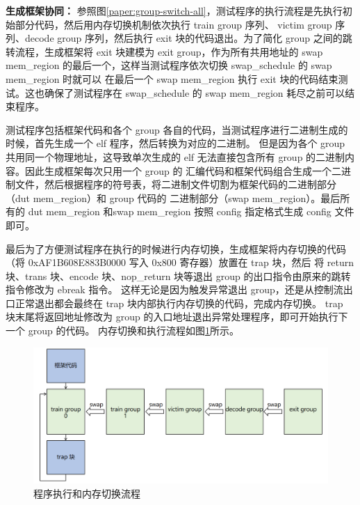 \textbf{生成框架协同：}
参照图\ref{paper:group-switch-all}，测试程序的执行流程是先执行初始部分代码，然后用内存切换机制依次执行 train group 序列、
victim group 序列、decode group 序列，然后执行 exit 块的代码退出。为了简化 group 之间的跳转流程，生成框架将 exit 块建模为
 exit group，作为所有共用地址的 swap mem\_region 的最后一个，这样当测试程序依次切换 swap\_schedule 的 swap mem\_region 时就可以
在最后一个 swap mem\_region 执行 exit 块的代码结束测试。这也确保了测试程序在 swap\_schedule 的 swap mem\_region 耗尽之前可以结束程序。\par

测试程序包括框架代码和各个 group 各自的代码，当测试程序进行二进制生成的时候，首先生成一个 elf 程序，然后转换为对应的二进制。
但是因为各个 group 共用同一个物理地址，这导致单次生成的 elf 无法直接包含所有 group 的二进制内容。因此生成框架每次只用一个 group 的
汇编代码和框架代码组合生成一个二进制文件，然后根据程序的符号表，将二进制文件切割为框架代码的二进制部分（dut mem\_region）和 group 代码的
二进制部分（swap mem\_region）。最后所有的 dut mem\_region 和swap mem\_region 按照 config 指定格式生成 config 文件即可。\par

最后为了方便测试程序在执行的时候进行内存切换，生成框架将内存切换的代码（将 0xAF1B608E883B0000 写入 0x800 寄存器）放置在 trap 块，然后
将 return 块、trans 块、encode 块、nop\_return 块等退出 group 的出口指令由原来的跳转指令修改为 ebreak 指令。
这样无论是因为触发异常退出 group，还是从控制流出口正常退出都会最终在 trap 块内部执行内存切换的代码，完成内存切换。
trap 块末尾将返回地址修改为 group 的入口地址退出异常处理程序，即可开始执行下一个 group 的代码。
内存切换和执行流程如图\ref{paper:execute-flow}所示。\par

\begin{figure}[!h]
    \centering
    \includegraphics[width=\linewidth]{figure/paper/execute-flow.png}
    \caption{程序执行和内存切换流程}
    \label{paper:execute-flow}
\end{figure}

